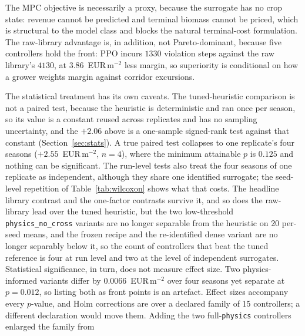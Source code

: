 The MPC objective is necessarily a proxy,
because the surrogate has no crop state: revenue cannot be predicted and terminal biomass
cannot be priced, which is structural to the model class and blocks the natural
terminal-cost formulation. The raw-library advantage is, in addition, not Pareto-dominant,
because five controllers hold the front: PPO incurs $1330$ violation steps against the raw library's
$4130$, at $3.86$~EUR\,m$^{-2}$ less margin, so superiority is conditional on how a grower
weights margin against corridor excursions.

The statistical treatment has its own caveats. The tuned-heuristic comparison is not a
paired test, because the heuristic is deterministic and ran once per season, so its value
is a constant reused across replicates and has no sampling uncertainty, and the $+2.06$
above is a one-sample signed-rank test against that constant (Section~\ref{sec:stats}). A
true paired test collapses to one replicate's four seasons ($+2.55$~EUR\,m$^{-2}$, $n=4$),
where the minimum attainable $p$ is $0.125$ and nothing can be significant.
The run-level tests also treat the four seasons of one replicate as independent, although
they share one identified surrogate; the seed-level repetition of Table~\ref{tab:wilcoxon}
shows what that costs. The headline library contrast and the one-factor contrasts survive
it, and so does the raw-library lead over the tuned heuristic, but the two low-threshold
\texttt{physics\_no\_cross} variants are no longer separable from the heuristic on 20
per-seed means, and the frozen recipe and the re-identified dense variant are no longer
separably below it, so the count of controllers that beat the tuned reference is four at
run level and two at the level of independent surrogates.
Statistical significance, in turn, does not measure effect size. Two physics-informed
variants differ by $0.0066$~EUR\,m$^{-2}$ over four seasons yet separate at $p=0.012$, so
listing both as front points is an artefact. Effect sizes accompany every $p$-value, and
Holm corrections are over a declared family of 15 controllers; a different declaration
would move them. Adding the two full-\texttt{physics} controllers enlarged the family from
